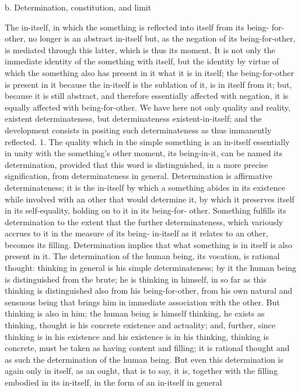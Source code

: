 b. Determination, constitution, and limit

The in-itself, in which the something is reflected into itself from its being-
for-other, no longer is an abstract in-itself but, as the negation of its
being-for-other, is mediated through this latter, which is thus its moment.
It is not only the immediate identity of the something with itself, but
the identity by virtue of which the something also has present in it what
it is in itself; the being-for-other is present in it because the in-itself is the
sublation of it, is in itself from it; but, because it is still abstract, and therefore
essentially affected with negation, it is equally affected with being-for-other.
We have here not only quality and reality, existent determinateness, but
determinateness existent-in-itself; and the development consists in positing
such determinateness as thus immanently reflected.
1. The quality which in the simple something is an in-itself essentially in
unity with the something’s other moment, its being-in-it, can be named its
determination, provided that this word is distinguished, in a more precise
signification, from determinateness in general. Determination is affirmative
determinateness; it is the in-itself by which a something abides in its
existence while involved with an other that would determine it, by which
it preserves itself in its self-equality, holding on to it in its being-for-
other. Something fulfills its determination to the extent that the further
determinateness, which variously accrues to it in the measure of its being-
in-itself as it relates to an other, becomes its filling. Determination implies
that what something is in itself is also present in it.
The determination of the human being, its vocation, is rational thought:
thinking in general is his simple determinateness; by it the human being
is distinguished from the brute; he is thinking in himself, in so far as
this thinking is distinguished also from his being-for-other, from his own
natural and sensuous being that brings him in immediate association with
the other. But thinking is also in him; the human being is himself thinking,
he exists as thinking, thought is his concrete existence and actuality; and,
further, since thinking is in his existence and his existence is in his thinking,
thinking is concrete, must be taken as having content and filling; it is rational
thought and as such the determination of the human being. But even this
determination is again only in itself, as an ought, that is to say, it is, together
with the filling embodied in its in-itself, in the form of an in-itself in general
